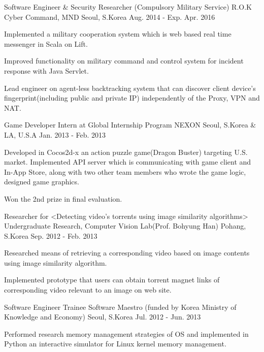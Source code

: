 \begin{cventries}
  \cventry
    {Software Engineer \& Security Researcher (Compulsory Military Service)}
    {R.O.K Cyber Command, MND}
    {Seoul, S.Korea}
    {Aug. 2014 - Exp. Apr. 2016}
    {
      \begin{cvitems}
        \item {Implemented a military cooperation system which is web based real time messenger in Scala on Lift.}
        \item {Improved functionality on military command and control system for incident response with Java Servlet.}
        \item {Lead engineer on agent-less backtracking system that can discover client device's fingerprint(including public and private IP) independently of the Proxy, VPN and NAT.}
      \end{cvitems}
    }
  \cventry
    {Game Developer Intern at Global Internship Program}
    {NEXON}
    {Seoul, S.Korea \& LA, U.S.A}
    {Jan. 2013 - Feb. 2013}
    {
      \begin{cvitems}
        \item {Developed in Cocos2d-x an action puzzle game(Dragon Buster) targeting U.S. market. Implemented API server which is communicating with game client and In-App Store, along with two other team members who wrote the game logic, designed game graphics.}
        \item {Won the 2nd prize in final evaluation.}
      \end{cvitems}
    }
  \cventry
    {Researcher for <Detecting video’s torrents using image similarity algorithms>}
    {Undergraduate Research, Computer Vision Lab(Prof. Bohyung Han)}
    {Pohang, S.Korea}
    {Sep. 2012 - Feb. 2013}
    {
      \begin{cvitems}
        \item {Researched means of retrieving a corresponding video based on image contents using image similarity algorithm.}
        \item {Implemented prototype that users can obtain torrent magnet links of corresponding video relevant to an image on web site.}
      \end{cvitems} 
    }
  \cventry
    {Software Engineer Trainee}
    {Software Maestro (funded by Korea Ministry of Knowledge and Economy)}
    {Seoul, S.Korea}
    {Jul. 2012 - Jun. 2013}
    {
      \begin{cvitems}
        \item {Performed research memory management strategies of OS and implemented in Python an interactive simulator for Linux kernel memory management.}

\end{cvitems}}
\end{cventries}
